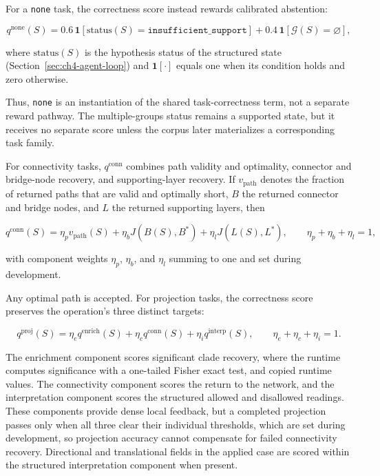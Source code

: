 \documentclass[thesis,letterpaper,12pt]{utthesis}
\begin{document}
For a \texttt{none} task, the correctness score instead rewards calibrated abstention:

\begin{equation}
    q^{\mathrm{none}}(S)
    =0.6\,\mathbf{1}[\mathrm{status}(S)=\texttt{insufficient\_support}]
    +0.4\,\mathbf{1}[\mathcal{G}(S)=\varnothing],
\end{equation}

where $\mathrm{status}(S)$ is the hypothesis status of the structured state (Section~\ref{sec:ch4-agent-loop}) and $\mathbf{1}[\cdot]$ equals one when its condition holds and zero otherwise.

Thus, \texttt{none} is an instantiation of the shared task-correctness term, not a separate reward pathway. The multiple-groups status remains a supported state, but it receives no separate score unless the corpus later materializes a corresponding task family.

For connectivity tasks, $q^{\mathrm{conn}}$ combines path validity and optimality, connector and bridge-node recovery, and supporting-layer recovery. If $v_{\mathrm{path}}$ denotes the fraction of returned paths that are valid and optimally short, $B$ the returned connector and bridge nodes, and $L$ the returned supporting layers, then

\begin{equation}
    q^{\mathrm{conn}}(S)
    =\eta_p v_{\mathrm{path}}(S)
    +\eta_b J(B(S),B^*)
    +\eta_l J(L(S),L^*),
    \qquad \eta_p+\eta_b+\eta_l=1,
\end{equation}

with component weights $\eta_p$, $\eta_b$, and $\eta_l$ summing to one and set during development.

Any optimal path is accepted. For projection tasks, the correctness score preserves the operation's three distinct targets:

\begin{equation}
    q^{\mathrm{proj}}(S)
    =\eta_e q^{\mathrm{enrich}}(S)
    +\eta_c q^{\mathrm{conn}}(S)
    +\eta_i q^{\mathrm{interp}}(S),
    \qquad \eta_e+\eta_c+\eta_i=1.
\end{equation}

The enrichment component scores significant clade recovery, where the runtime computes significance with a one-tailed Fisher exact test, and copied runtime values. The connectivity component scores the return to the network, and the interpretation component scores the structured allowed and disallowed readings. These components provide dense local feedback, but a completed projection passes only when all three clear their individual thresholds, which are set during development, so projection accuracy cannot compensate for failed connectivity recovery. Directional and translational fields in the applied case are scored within the structured interpretation component when present.
\end{document}
